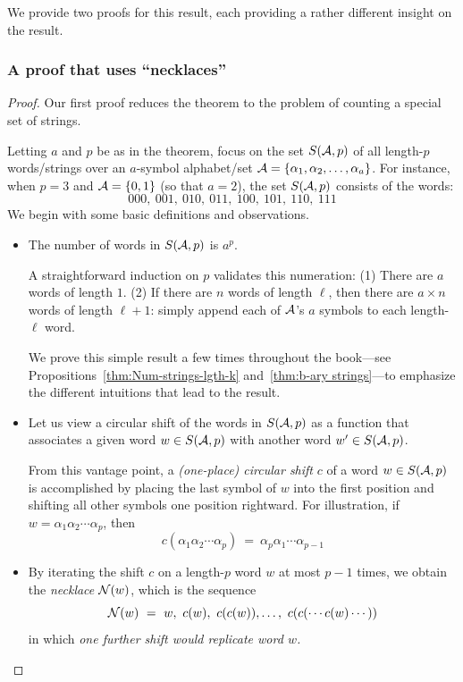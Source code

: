 \noindent
We provide two proofs for this result, each providing a rather different insight on the result.

\subsubsection{A proof that uses ``necklaces''}
\label{sec:FTL-necklaces}

\begin{proof}
Our first proof reduces the theorem to the problem of counting a special set of strings.

Letting $a$ and $p$ be as in the theorem, focus on the set $S(\mbox{$\cal A$},p)$ of all length-$p$ words/strings over an $a$-symbol alphabet/set $\mbox{$\cal A$} = \{ \alpha_1, \alpha_2, \ldots, \alpha_a \}$.  For instance, when $p=3$ and $\mbox{$\cal A$} = \{0,1\}$ (so that $a=2$), the set $S(\mbox{$\cal A$},p)$ consists of the words:
\[ 000, \ 001, \ 010, \ 011, \ 100, \ 101, \ 110, \ 111 \]
We begin with some basic definitions and observations.
\begin{itemize}
\item
The number of words in $S(\mbox{$\cal A$},p)$ is $a^p$.

\smallskip

A straightforward induction on $p$ validates this numeration:  (1) There are $a$ words of length $1$.  (2) If there are $n$ words of length $\ell$, then there are $a \times n$ words of length $\ell+1$: simply append each of $\mbox{$\cal A$}$'s $a$ symbols to each length-$\ell$ word.

\smallskip

We prove this simple result a few times throughout the book---see Propositions~\ref{thm:Num-strings-lgth-k} and~\ref{thm:b-ary strings}---to emphasize the different intuitions that lead to the result.

\medskip\item
Let us view a circular shift of the words in $S(\mbox{$\cal A$},p)$ as a function that associates a given word $w \in S(\mbox{$\cal A$},p)$ with another word $w' \in S(\mbox{$\cal A$},p)$.

\smallskip

From this vantage point, a {\it (one-place) circular shift} $c$ of a word $w \in S(\mbox{$\cal A$},p)$ is accomplished by placing the last symbol of $w$ into the first position and shifting all other symbols one position rightward.  For illustration, if $w = \alpha_1 \alpha_2 \cdots \alpha_p$, then
\[ c(\alpha_1 \alpha_2 \cdots \alpha_p) \ = \ \alpha_p \alpha_1 \cdots \alpha_{p-1} \]

\medskip\item
By iterating the shift $c$ on a length-$p$ word $w$ at most $p-1$ times, we obtain the {\it necklace} $\mbox{$\cal N$}(w)$, which is the sequence
\[ \n(w) \ = \ w, \ c(w), \ c(c(w)), \ldots, \ c(c(\cdots c(w) \cdots )) \]
in which {\em one further shift would replicate word $w$.}


\end{itemize}
\end{proof}
